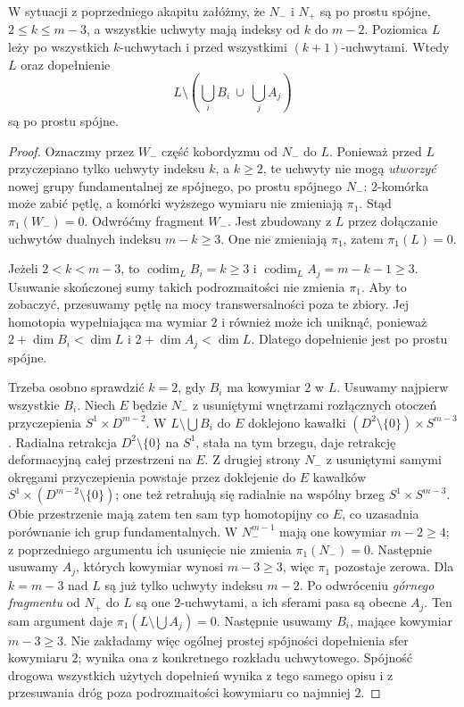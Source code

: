\begin{lemat}
\label{lem:komplement-whitney-19}
W sytuacji z poprzedniego akapitu
załóżmy, że $N_-$ i $N_+$ są
po prostu spójne, $2\leq k\leq m-3$, a wszystkie uchwyty
mają indeksy od $k$ do $m-2$. Poziomica $L$ leży po wszystkich
$k$-uchwytach i przed wszystkimi $(k+1)$-uchwytami.
Wtedy $L$ oraz dopełnienie
\[
 L\setminus
   \left(\bigcup_i B_i\ \cup\ \bigcup_j A_j\right)
\]
są po prostu spójne.
\end{lemat}
\begin{proof}
Oznaczmy przez $W_-$ część
kobordyzmu od $N_-$ do $L$.
Ponieważ przed $L$ przyczepiano
tylko uchwyty indeksu $k$,
a $k\geq2$, te uchwyty nie mogą
\emph{utworzyć} nowej grupy
fundamentalnej ze spójnego,
po prostu spójnego $N_-$:
$2$-komórka może zabić pętlę,
a komórki wyższego wymiaru
nie zmieniają $\pi_1$.
Stąd $\pi_1(W_-)=0$.
Odwróćmy fragment $W_-$.
Jest zbudowany z $L$
przez dołączanie uchwytów
dualnych indeksu $m-k\geq3$.
One nie zmieniają $\pi_1$,
zatem $\pi_1(L)=0$.

Jeżeli $2<k<m-3$, to
$\operatorname{codim}_L B_i=k\geq3$
i $\operatorname{codim}_L A_j
=m-k-1\geq3$.
Usuwanie skończonej sumy
takich podrozmaitości nie
zmienia $\pi_1$.
Aby to zobaczyć, przesuwamy
pętlę na mocy transwersalności
poza te zbiory.
Jej homotopia wypełniająca
ma wymiar $2$ i również
może ich uniknąć, ponieważ
$2+\dim B_i<\dim L$
i $2+\dim A_j<\dim L$.
Dlatego dopełnienie jest
po prostu spójne.

Trzeba osobno sprawdzić
$k=2$, gdy $B_i$ ma
kowymiar $2$ w $L$.
Usuwamy najpierw wszystkie $B_i$.
Niech $E$ będzie $N_-$ z usuniętymi wnętrzami rozłącznych
otoczeń przyczepienia $S^1\times D^{m-2}$.
W $L\setminus\bigcup B_i$ do $E$ doklejono kawałki
$(D^2\setminus\{0\})\times S^{m-3}$.
Radialna retrakcja $D^2\setminus\{0\}$ na $S^1$, stała
na tym brzegu, daje retrakcję deformacyjną całej przestrzeni na $E$.
Z drugiej strony $N_-$ z usuniętymi samymi okręgami przyczepienia
powstaje przez doklejenie do $E$ kawałków
$S^1\times(D^{m-2}\setminus\{0\})$; one też retrahują się
radialnie na wspólny brzeg $S^1\times S^{m-3}$.
Obie przestrzenie mają zatem ten sam typ homotopijny co $E$,
co uzasadnia porównanie ich grup fundamentalnych.
W $N_-^{m-1}$ mają one
kowymiar $m-2\geq4$;
z poprzedniego argumentu
ich usunięcie nie zmienia
$\pi_1(N_-)=0$.
Następnie usuwamy $A_j$,
których kowymiar wynosi
$m-3\geq3$, więc $\pi_1$
pozostaje zerowa.
Dla $k=m-3$ nad $L$ są już tylko uchwyty indeksu $m-2$.
Po odwróceniu \emph{górnego fragmentu} od $N_+$ do $L$
są one $2$-uchwytami, a ich sferami pasa są obecne $A_j$.
Ten sam argument daje $\pi_1(L\setminus\bigcup A_j)=0$.
Następnie usuwamy $B_i$, mające kowymiar $m-3\geq3$.
Nie zakładamy więc ogólnej prostej spójności dopełnienia sfer
kowymiaru $2$; wynika ona z konkretnego rozkładu uchwytowego.
Spójność drogowa wszystkich użytych dopełnień wynika z tego samego
opisu i z przesuwania dróg poza podrozmaitości kowymiaru co najmniej $2$.
\end{proof}

